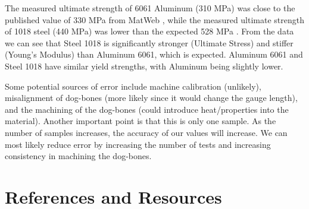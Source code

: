 \documentclass[conf]{new-aiaa} %
\begin{document}
The measured ultimate strength of 6061 Aluminum (310 MPa) was close to the
published value of 330 MPa from MatWeb \cite{matweb6061}, while the measured
ultimate strength of 1018 steel (440 MPa) was lower than the expected 528 MPa
\cite{matweb1018}. From the data we can see that Steel 1018 is significantly stronger (Ultimate Stress) and stiffer (Young's Modulus) than Aluminum 6061, which is expected.
Aluminum 6061 and Steel 1018 have similar yield strengths, with Aluminum being slightly lower.

Some potential sources of error include machine calibration (unlikely), misalignment of dog-bones (more likely since it would change the gauge length), and the machining of the dog-bones (could introduce heat/properties into the material).
Another important point is that this is only one sample.
As the number of samples increases, the accuracy of our values will increase.
We can most likely reduce error by increasing the number of tests and increasing consistency in machining the dog-bones.

\section{References and Resources}



\end{document}
